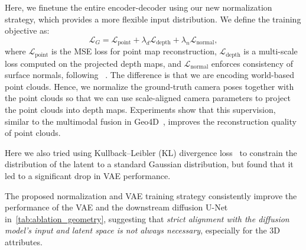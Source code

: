 Here, we finetune the entire encoder-decoder using our new normalization strategy, which provides a more flexible input distribution.
We define the training objective as:
\begin{equation}
\label{eq:geometry_loss}
\mathcal{L}_G = \mathcal{L}_{\text{point}} + \lambda_{d}\mathcal{L}_{\text{depth}} + \lambda_{n}\mathcal{L}_{\text{normal}},
\end{equation}
where
$\mathcal{L}_{\text{point}}$
is the MSE loss for point map reconstruction,
$\mathcal{L}_{\text{depth}}$
is a multi-scale loss computed on the projected depth maps,
and
$\mathcal{L}_{\text{normal}}$ enforces consistency of surface normals, following ~\cite{xu2025geometrycrafter, wang2024moge}.
The difference is that we are encoding world-based point clouds.
Hence, we normalize the ground-truth camera poses together with the point clouds so that
we can use scale-aligned camera parameters to project the point clouds into depth maps.
Experiments show that this supervision, similar to the multimodal fusion in Geo4D~\cite{jiang2025geo4d}, improves the reconstruction quality of point clouds.

Here we also tried using Kullback–Leibler (KL) divergence loss~\cite{kullback1951information} to constrain the distribution of the latent to a standard Gaussian distribution,
but found that it led to a significant drop in VAE performance.

The proposed normalization and VAE training strategy consistently improve the performance of the VAE and the downstream diffusion U-Net in~\cref{tab:ablation_geometry},
suggesting that \emph{strict alignment with the diffusion model's input and latent space is not always necessary},
especially for the 3D attributes. 

